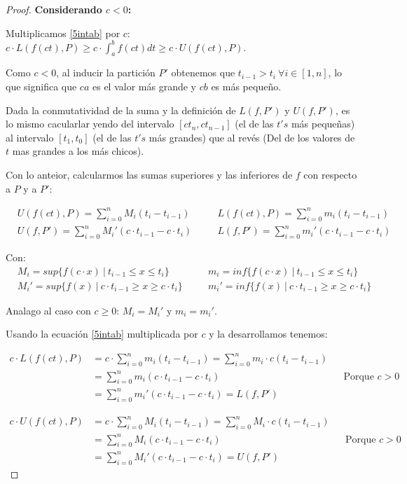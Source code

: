 \documentclass[12pt]{article}
\begin{document}
\begin{proof}
    \textbf{Considerando $c<0$:}\bigskip

    Multiplicamos \eqref{5intab} por $c$: \quad \(c\cdot L(f(ct),P)\geq c\cdot\int_{a}^{b}f(ct)dt\geq c\cdot U(f(ct),P)\).\bigskip

    Como $c<0$, al inducir la partici\'on $P'$ obtenemos que $t_{i-1}>t_i \ \forall i \in[1,n]$, lo que significa que $ca$ es el valor m\'as grande y $cb$ es m\'as pequeño.\bigskip

    Dada la conmutatividad de la suma y la definici\'on de $L(f,P')$ y $U(f,P')$, es lo mismo cacularlar yendo del intervalo $[ct_n,ct_{n-1}]$ (el de las $t's$ m\'as pequeñas) al intervalo $[t_1,t_0]$ (el de las $t's$ m\'as grandes) que al rev\'es (Del de los valores de $t$ mas grandes a los m\'as chicos).\bigskip

    Con lo anteior, calcularmos las sumas superiores y las inferiores de $f$ con respecto a $P$ y a $P'$:

    \begin{align*}
        &U(f(ct),P)=\sum_{i=0}^n M_i(t_i-t_{i-1}) \quad &&L(f(ct),P)=\sum_{i=0}^n m_i(t_i-t_{i-1})\\
        &U(f,P')=\sum_{i=0}^n M_i'(c\cdot t_{i-1}-c\cdot t_i) \quad &&L(f,P')=\sum_{i=0}^n m_i'(c\cdot t_{i-1}-c\cdot t_i)
    \end{align*}

    Con:
    \begin{align*}
        &M_i=sup\{f(c\cdot x) \ | \ t_{i-1}\leq x\leq t_i\} \quad &&m_i=inf\{f(c\cdot x) \ | \ t_{i-1}\leq x\leq t_i\}\\
        &M_i'=sup\{f(x) \ | \ c\cdot t_{i-1}\geq x\geq c\cdot t_i\} \quad &&m_i'=inf\{f(x) \ | \ c\cdot t_{i-1}\geq x\geq c\cdot t_i\}
    \end{align*}

    Analago al caso con $c\geq0$: $M_i=M_i'$ y $m_i=m_i'$.

    Usando la ecuaci\'on \eqref{5intab} multiplicada por $c$ y la desarrollamos tenemos:

    \begin{align*}
        c\cdot L(f(ct),P) &= c \cdot \sum_{i=0}^n m_i(t_i-t_{i-1}) = \sum_{i=0}^n m_i\cdot c(t_i-t_{i-1}) \\
        &= \sum_{i=0}^n m_i(c\cdot t_{i-1}-c\cdot t_i) \quad &&\text{Porque $c>0$}\\
        &= \sum_{i=0}^n m_i'(c\cdot t_{i-1}-c\cdot t_i) = L(f,P')
    \end{align*}

    \begin{align*}
        c\cdot U(f(ct),P) &= c \cdot \sum_{i=0}^n M_i(t_i-t_{i-1}) = \sum_{i=0}^n M_i\cdot c(t_i-t_{i-1}) \\
        &= \sum_{i=0}^n M_i(c\cdot t_{i-1}-c\cdot t_i) \quad &&\text{Porque $c>0$}\\
        &= \sum_{i=0}^n M_i'(c\cdot t_{i-1}-c\cdot t_i) = U(f,P')
    \end{align*}


\end{proof}
\end{document}
